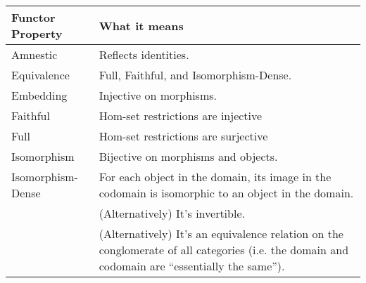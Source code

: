 \begin{tabular}{| p{2.5cm} | p{6cm} |}
\hline
\textbf{Functor Property} & \textbf{What it means}\\\hline
Amnestic & Reflects identities.\\ \hline
Equivalence & Full, Faithful, and Isomorphism-Dense.\\\hline
Embedding & Injective on morphisms.\\ \hline
Faithful & Hom-set restrictions are injective\\ \hline
Full & Hom-set restrictions are surjective\\ \hline
Isomorphism & Bijective on morphisms and objects.\\\hline
Isomorphism-Dense & For each object in the domain, its image in
the codomain is isomorphic to an object in the domain.\\\hline
& (Alternatively) It's invertible. \\ \hline
& (Alternatively) It's an equivalence relation on the
conglomerate of all categories (i.e. the domain and codomain are
``essentially the same'').\\ \hline
\end{tabular}
